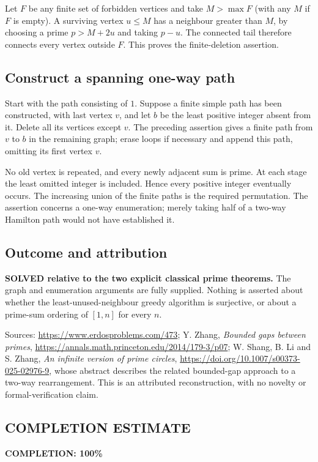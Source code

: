 Let $F$ be any finite set of forbidden vertices and take $M>\max F$ (with any $M$ if $F$ is empty). A surviving vertex $u\le M$ has a neighbour greater than $M$, by choosing a prime $p>M+2u$ and taking $p-u$. The connected tail therefore connects every vertex outside $F$. This proves the finite-deletion assertion.

\subsection*{Construct a spanning one-way path}
Start with the path consisting of $1$. Suppose a finite simple path has been constructed, with last vertex $v$, and let $b$ be the least positive integer absent from it. Delete all its vertices except $v$. The preceding assertion gives a finite path from $v$ to $b$ in the remaining graph; erase loops if necessary and append this path, omitting its first vertex $v$.

No old vertex is repeated, and every newly adjacent sum is prime. At each stage the least omitted integer is included. Hence every positive integer eventually occurs. The increasing union of the finite paths is the required permutation. The assertion concerns a one-way enumeration; merely taking half of a two-way Hamilton path would not have established it.

\subsection*{Outcome and attribution}
\textbf{SOLVED relative to the two explicit classical prime theorems.} The graph and enumeration arguments are fully supplied. Nothing is asserted about whether the least-unused-neighbour greedy algorithm is surjective, or about a prime-sum ordering of $[1,n]$ for every $n$.

Sources: \url{https://www.erdosproblems.com/473}; Y. Zhang, \emph{Bounded gaps between primes}, \url{https://annals.math.princeton.edu/2014/179-3/p07}; W. Shang, B. Li and S. Zhang, \emph{An infinite version of prime circles}, \url{https://doi.org/10.1007/s00373-025-02976-9}, whose abstract describes the related bounded-gap approach to a two-way rearrangement. This is an attributed reconstruction, with no novelty or formal-verification claim.

\subsection*{COMPLETION ESTIMATE}
\textbf{COMPLETION: 100\%}
